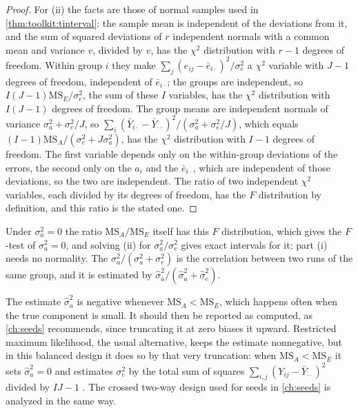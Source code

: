 \begin{refsection}
\begin{proof}
For (ii) the facts are those of normal samples used in \cref{thm:toolkit:tinterval}: the sample mean is independent of the deviations from it, and the sum of squared deviations of $r$ independent normals with a common mean and variance $v$, divided by $v$, has the $\chi^2$ distribution with $r-1$ degrees of freedom. Within group $i$ they make $\sum_j(e_{ij}-\bar e_{i\cdot})^2/\sigma_e^2$ a $\chi^2$ variable with $J-1$ degrees of freedom, independent of $\bar e_{i\cdot}$; the groups are independent, so $I(J-1)\mathrm{MS}_E/\sigma_e^2$, the sum of these $I$ variables, has the $\chi^2$ distribution with $I(J-1)$ degrees of freedom. The group means are independent normals of variance $\sigma_a^2+\sigma_e^2/J$, so $\sum_i(\bar Y_{i\cdot}-\bar Y_{\cdot\cdot})^2/(\sigma_a^2+\sigma_e^2/J)$, which equals $(I-1)\mathrm{MS}_A/(\sigma_e^2+J\sigma_a^2)$, has the $\chi^2$ distribution with $I-1$ degrees of freedom. The first variable depends only on the within-group deviations of the errors, the second only on the $a_i$ and the $\bar e_{i\cdot}$, which are independent of those deviations, so the two are independent. The ratio of two independent $\chi^2$ variables, each divided by its degrees of freedom, has the $F$ distribution by definition, and this ratio is the stated one.
\end{proof}

Under $\sigma_a^2=0$ the ratio $\mathrm{MS}_A/\mathrm{MS}_E$ itself has this $F$ distribution, which gives the $F$-test of $\sigma_a^2=0$, and solving (ii) for $\sigma_a^2/\sigma_e^2$ gives exact intervals for it; part (i) needs no normality. The  $\sigma_a^2/(\sigma_a^2+\sigma_e^2)$ is the correlation between two runs of the same group, and it is estimated by $\hat\sigma_a^2/(\hat\sigma_a^2+\hat\sigma_e^2)$.

The estimate $\hat\sigma_a^2$ is negative whenever $\mathrm{MS}_A<\mathrm{MS}_E$, which happens often when the true component is small. It should then be reported as computed, as \cref{ch:seeds} recommends, since truncating it at zero biases it upward. Restricted maximum likelihood, the usual alternative, keeps the estimate nonnegative, but in this balanced design it does so by that very truncation: when $\mathrm{MS}_A<\mathrm{MS}_E$ it sets $\hat\sigma_a^2=0$ and estimates $\sigma_e^2$ by the total sum of squares $\sum_{i,j}(Y_{ij}-\bar Y_{\cdot\cdot})^2$ divided by $IJ-1$ \parencite[Chapter~3]{SearleCasellaMcCulloch1992}. The crossed two-way design used for seeds in \cref{ch:seeds} is analyzed in the same way.


\end{refsection}
